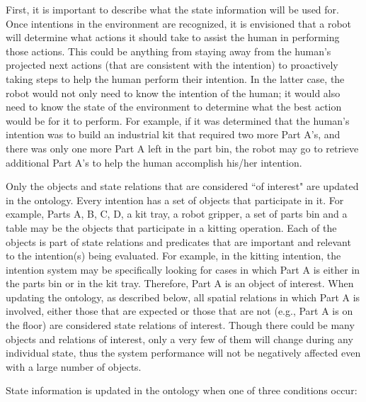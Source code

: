 \documentclass[preprint,12pt]{elsarticle}
\begin{document}
First, it is important to describe what the state information will be used for. Once intentions in the environment are recognized, it is envisioned that a robot will determine what actions it should take to assist the human in performing those actions. This could be anything from staying away from the human's projected next actions (that are consistent with the intention) to proactively taking steps to help the human perform their intention. In the latter case, the robot would not only need to know the intention of the human; it would also need to know the state of the environment to determine what the best action would be for it to perform. For example, if it was determined that the human's intention was to build an industrial kit that required two more Part A's, and there was only one more Part A left in the part bin, the robot may go to retrieve additional Part A's to help the human accomplish his/her intention.

Only the objects and state relations that are considered ``of interest" are updated in the ontology. Every intention has a set of objects that participate in it. For example, Parts A, B, C, D, a kit tray, a robot gripper, a set of parts bin and a table may be the objects that participate in a kitting operation. Each of the objects is part of state relations and predicates that are important and relevant to the intention(s) being evaluated. For example, in the kitting intention, the intention system may be specifically looking for cases in which Part A is either in the parts bin or in the kit tray. Therefore, Part A is an object of interest. When updating the ontology, as described below, all spatial relations in which Part A is involved, either those that are expected or those that are not (e.g., Part A is on the floor) are considered state relations of interest. Though there could be many objects and relations of interest, only a very few of them will change during any individual state, thus the system performance will not be negatively affected even with a large number of objects.


State information is updated in the ontology when one of three conditions occur:
\end{document}
